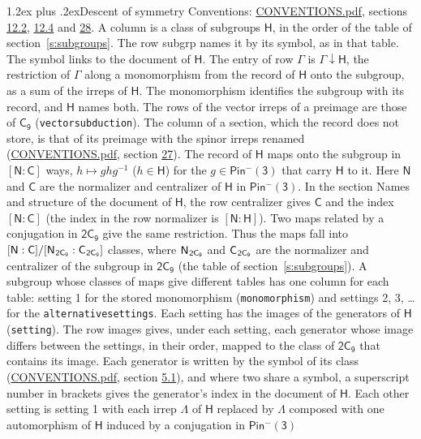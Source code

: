 \documentclass[10pt,a4paper]{article}
\makeatletter
\renewcommand\section{\@startsection{section}{1}{\z@}{-3ex plus -1ex minus -.2ex}%
  {1.2ex plus .2ex}{\normalfont\large\sffamily\bfseries\color{parttitle}}}
\numberwithin{equation}{section}
\newcommand{\grp}[1]{\mathsf{#1}}
\newcommand{\grpindex}[2]{[#1 : #2]}
\newcommand{\restr}[2]{#1\!\downarrow#2}
\newcommand{\hairsp}{\mkern1mu}
\makeatother
\begin{document}
\section{Descent of symmetry}\label{s:subduction}
Conventions: \href{../../CONVENTIONS.pdf}{CONVENTIONS.pdf}, sections \href{../../../rotation/CONVENTIONS.pdf\#conv.12.2}{12.2}, \href{../../../rotation/CONVENTIONS.pdf\#conv.12.4}{12.4} and \href{../../CONVENTIONS.pdf\#conv.28}{28}.
A column is a class of subgroups $\grp{H}$, in the order of the table of section~\ref{s:subgroups}. The row subgrp names it by its symbol, as in that table. The symbol links to the document of $\grp{H}$. The entry of row $\Gamma$ is $\restr{\Gamma}{\grp{H}}$, the restriction of $\Gamma$ along a monomorphism from the record of $\grp{H}$ onto the subgroup, as a sum of the irreps of $\grp{H}$. The monomorphism identifies the subgroup with its record, and $\grp{H}$ names both. The rows of the vector irreps of a preimage are those of \href{../../../rotation/data/pdf/C9.pdf}{$\grp{C_{9}}$} (\texttt{vectorsubduction}). The column of a section, which the record does not store, is that of its preimage with the spinor irreps renamed (\href{../../CONVENTIONS.pdf}{CONVENTIONS.pdf}, section \href{../../CONVENTIONS.pdf\#conv.27}{27}). \label{n:group.normalizer.o3}\label{n:group.centralizer.o3}\label{n:element.h}The record of $\grp{H}$ maps onto the subgroup in $\grpindex{\grp{N}}{\grp{C}}$ ways, $h \mapsto g h g^{-1}$ ($h \in \grp{H}$) for the $g \in \grp{Pin^{-}(3)}$ that carry $\grp{H}$ to it. Here $\grp{N}$ and $\grp{C}$ are the normalizer and centralizer of $\grp{H}$ in \href{Pinminus3.pdf}{$\grp{Pin^{-}(3)}$}. In the section Names and structure of the document of $\grp{H}$, the row centralizer gives $\grp{C}$ and the index $\grpindex{\grp{N}}{\grp{C}}$ (the index in the row normalizer is $\grpindex{\grp{N}}{\grp{H}}$). Two maps related by a conjugation in $\grp{2C_{9}}$ give the same restriction. Thus the maps fall into $\grpindex{\grp{N}}{\grp{C}}/\grpindex{\grp{N}_{\hairsp \grp{2C_{9}}}}{\grp{C}_{\hairsp \grp{2C_{9}}}}$ classes, where $\grp{N}_{\hairsp \grp{2C_{9}}}$ and $\grp{C}_{\hairsp \grp{2C_{9}}}$ are the normalizer and centralizer of the subgroup in $\grp{2C_{9}}$ (the table of section~\ref{s:subgroups}). \label{n:head.setting}A subgroup whose classes of maps give different tables has one column for each table: setting 1 for the stored monomorphism (\texttt{monomorphism}) and settings 2, 3, \dots{} for the \texttt{alternativesettings}. Each setting has the images of the generators of $\grp{H}$ (\texttt{setting}). \label{n:head.images}The row images gives, under each setting, each generator whose image differs between the settings, in their order, mapped to the class of $\grp{2C_{9}}$ that contains its image. Each generator is written by the symbol of its class (\href{../../CONVENTIONS.pdf}{CONVENTIONS.pdf}, section \href{../../../rotation/CONVENTIONS.pdf\#conv.5.1}{5.1}), and where two share a symbol, a superscript number in brackets gives the generator's index in the document of $\grp{H}$. \label{n:irrep.Delta}Each other setting is setting 1 with each irrep $\Lambda$ of $\grp{H}$ replaced by $\Lambda$ composed with one automorphism of $\grp{H}$ induced by a conjugation in \href{Pinminus3.pdf}{$\grp{Pin^{-}(3)}$} 
\end{document}
